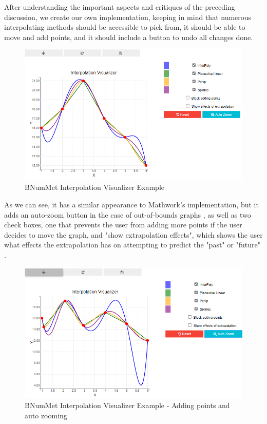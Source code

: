 After understanding the important aspects and critiques of the preceding discussion, we create our own implementation, keeping in mind that numerous interpolating methods should be accessible to pick from, it should be able to move and add points, and it should include a button to undo all changes done.
\begin{figure}[H]
    \centering
    \includegraphics[width=\textwidth]{Include/Images/Thesis/Development/Visualizers/INTERPOLATION VISUALIZER/BNumMet.Interpolation.Ex1.png}
    \caption{BNumMet Interpolation Visualizer Example}
    \label{fig:BNumMet Interpolation Visualizer Example}
\end{figure}
As we can see, it has a similar appearance to Mathwork's implementation, but it adds an auto-zoom button in the case of out-of-bounds graphs , as well as two check boxes, one that prevents the user from adding more points if the user decides to move the graph, and "show extrapolation effects", which shows the user what effects the extrapolation has on attempting to predict the "past" or "future"  . 
\begin{figure}[H]
    \centering
    \includegraphics[width=\textwidth]{Include/Images/Thesis/Development/Visualizers/INTERPOLATION VISUALIZER/BNumMet.Interpolation.Ex1.1.png}
    \caption{BNumMet Interpolation Visualizer Example - Adding points and auto zooming}
    \label{fig:BNumMet Interpolation Visualizer Example - Adding points and auto zooming}
\end{figure}
